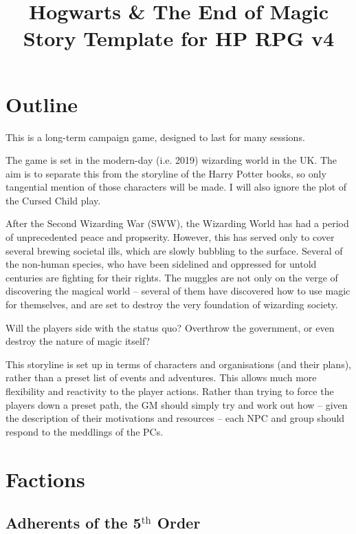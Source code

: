\documentclass[oneside]{book}
\begin{document}
\title{{\HP Hogwarts \& The End of Magic }\\ {\small Story Template for HP RPG v4}}

\maketitle

\section{Outline}

This is a long-term campaign game, designed to last for many sessions. 

The game is set in the modern-day (i.e. 2019) wizarding world in the UK. The aim is to separate this from the storyline of the Harry Potter books, so only tangential mention of those characters will be made. I will also ignore the plot of the Cursed Child play. 

After the Second Wizarding War (SWW), the Wizarding World has had a period of unprecedented peace and propserity. However, this has served only to cover several brewing societal ills, which are slowly bubbling to the surface. Several of the non-human species, who have been sidelined and oppressed for untold centuries are fighting for their rights. The muggles are not only on the verge of discovering the magical world -- several of them have discovered how to use magic for themselves, and are set to destroy the very foundation of wizarding society. 

Will the players side with the status quo? Overthrow the government, or even destroy the nature of magic itself?

This storyline is set up in terms of characters and organisations (and their plans), rather than a preset list of events and adventures. This allows much more flexibility and reactivity to the player actions. Rather than trying to force the players down a preset path, the GM should simply try and work out how -- given the description of their motivations and resources -- each NPC and group should respond to the meddlings of the PCs. 

\def\p{2}
\def\q{15}
\def\s{0.3}
\section{Factions}

\subsection{Adherents of the 5$^\text{th}$ Order}
\end{document}
